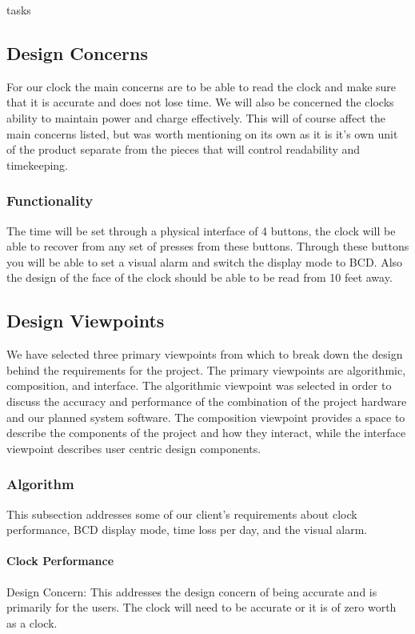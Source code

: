 tasks\documentclass[onecolumn, draftclsnofoot,10pt, compsoc]{IEEEtran}
\begin{document}
\subsection{Design Concerns}

For our clock the main concerns are to be able to read the clock and make sure that it is accurate and does not lose time.
We will also be concerned the clocks ability to maintain power and charge effectively.
This will of course affect the main concerns listed, but was worth mentioning on its own as it is it's own unit of the product separate from the pieces that will control readability and timekeeping.

\subsubsection{Functionality}
The time will be set through a physical interface of 4 buttons, the clock will be able to recover from any set of presses from these buttons.
Through these buttons you will be able to set a visual alarm and switch the display mode to BCD.
Also the design of the face of the clock should be able to be read from 10 feet away.

\subsection{Design Viewpoints}

We have selected three primary viewpoints from which to break down the design behind the requirements for the project.
The primary viewpoints are algorithmic, composition, and interface.
The algorithmic viewpoint was selected in order to discuss the accuracy and performance of the combination of the project hardware and our planned system software.
The composition viewpoint provides a space to describe the components of the project and how they interact, while the interface viewpoint describes user centric design components.


\subsubsection{Algorithm}
This subsection addresses some of our client's requirements about clock performance, BCD display mode, time loss per day, and the visual alarm.

\paragraph{Clock Performance}
\vspace{2mm} Design Concern: This addresses the design concern of being accurate and is primarily for the users.
The clock will need to be accurate or it is of zero worth as a clock.
\end{document}
